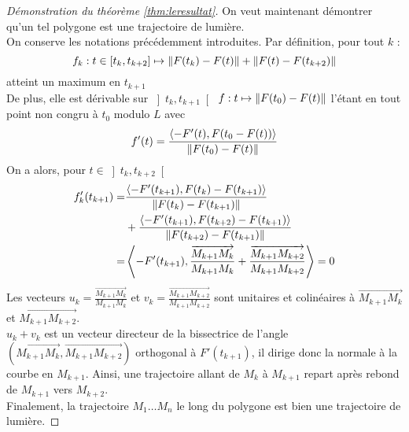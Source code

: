 \documentclass{cours}
\begin{document}
\begin{proof}[Démonstration du théorème \ref{thm:leresultat}]
    On veut maintenant démontrer qu'un tel polygone est une trajectoire de lumière.\\
    On conserve les notations précédemment introduites.
    Par définition, pour tout $k$ :
    \[
        f_{k} : t\in \left[t_{k}, t_{k + 2}\right] \mapsto \left\lVert F(t_{k})-F(t) \right\rVert + \left\lVert F(t) - F(t_{k + 2}) \right\rVert
    \]
    atteint un maximum en $t_{k + 1}$\\
    De plus, elle est dérivable sur $\left]t_{k}, t_{k + 1}\right[$ $f : t\mapsto \left\lVert F(t_{0}) - F(t) \right\rVert$ l'étant en tout point non congru à $t_{0}$ modulo $L$ avec
                \[
                    f'(t) = \frac{\left\langle -F'(t), F(t_{0} - F(t)) \right\rangle}{\left\lVert F(t_{0}) - F(t) \right\rVert}
                \]
                On a alors, pour $t \in \left]t_{k}, t_{k + 2} \right[$
    \[
        \begin{aligned}
            f'_{k}(t_{k + 1}) = & \frac{\left\langle -F'(t_{k + 1}), F(t_{k}) - F(t_{k + 1}) \right\rangle}{\left\lVert F(t_{k}) - F(t_{k + 1}) \right\rVert}                                                             \\
                                & + \frac{\left\langle -F'(t_{k + 1}), F(t_{k + 2}) - F(t_{k + 1}) \right\rangle}{\left\lVert F(t_{k + 2}) - F(t_{k + 1}) \right\rVert}                                                   \\
            =                   & \left\langle - F'(t_{k + 1}), \frac{\overrightarrow{M_{k + 1}M_{k}}}{M_{k + 1}M_{k}} + \frac{\overrightarrow{M_{k+1}M_{k + 2}}}{M_{k + 1}M_{k + 2}} \right\rangle = 0
        \end{aligned}
    \]
    Les vecteurs $u_{k} = \frac{\overrightarrow{M_{k + 1}M_{k}}}{M_{k + 1}M_{k}}$ et $v_{k} = \frac{\overrightarrow{M_{k+1}M_{k + 2}}}{M_{k + 1}M_{k + 2}}$ sont unitaires et colinéaires à $\overrightarrow{M_{k + 1}M_{k}}$ et $\overrightarrow{M_{k + 1}M_{k + 2}}$.\\
    $u_{k} + v_{k}$ est un vecteur directeur de la bissectrice de l'angle $\left(\overrightarrow{M_{k + 1}M_{k}}, \overrightarrow{M_{k + 1}M_{k + 2}}\right)$ orthogonal à $F'(t_{k + 1})$, il dirige donc la normale à la courbe en $M_{k + 1}$.
    Ainsi, une trajectoire allant de $M_{k}$ à $M_{k + 1}$ repart après rebond de $M_{k + 1}$ vers $M_{k + 2}$. \\
    Finalement, la trajectoire $M_{1}\ldots M_{n}$ le long du polygone est bien une trajectoire de lumière.
\end{proof}
\end{document}
